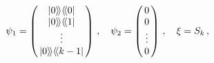 \begin{equation}
 \psi_1 =
\left( \begin{array}{@{\,}c@{\,}}
    |0\rangle\!\rangle \langle\!\langle 0 |  \\
    |0\rangle\!\rangle \langle\!\langle 1 |  \\
      \vdots               \\
    |0\rangle\!\rangle \langle\!\langle k-1 |  \\
  \end{array}  \right) \,,
\quad \psi_2=
\left( \begin{array}{@{\,}c@{\,}}
    0  \\
    0  \\
      \vdots               \\
    0  \\
  \end{array}  \right)
\,,\quad   \xi =S_k\,,\label{eq:5.10}
\end{equation}

